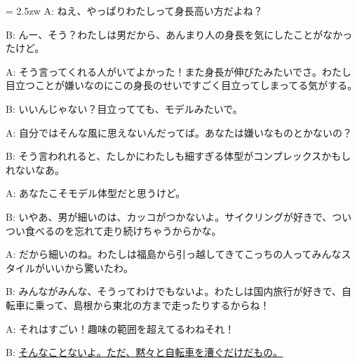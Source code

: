 \documentclass[11pt]{amsart}
\title{}
\author{}
\newenvironment{hangall}[1]{\hangindent = 2.5zw\everypar{\hangindent = 2.5zw}}{}
\begin{document}
\maketitle
\begin{hangall}{}%
A: ねえ、やっぱりわたしって身長高い方だよね？

B: んー、そう？わたしは男だから、あんまり人の身長を気にしたことがなかったけど。

A: そう言ってくれる人がいてよかった！また身長が伸びたみたいでさ。わたし目立つことが嫌いなのにこの身長のせいですごく目立ってしまってる気がする。

B: いいんじゃない？目立ってても、モデルみたいで。

A: 自分ではそんな風に思えないんだってば。あなたは嫌いなものとかないの？

B: そう言われれると、たしかにわたしも細すぎる体型がコンプレックスかもしれないなあ。

A: あなたこそモデル体型だと思うけど。

B: いやあ、男が細いのは、カッコがつかないよ。サイクリングが好きで、ついつい食べるのを忘れて走り続けちゃうからかな。

A: だから細いのね。わたしは福島から引っ越してきてこっちの人ってみんなスタイルがいいから驚いたわ。

B: みんながみんな、そうってわけでもないよ。わたしは国内旅行が好きで、自転車に乗って、島根から東北の方まで走ったりするからね！

A: それはすごい！趣味の範囲を超えてるわねそれ！

B: \ul{そんなことないよ。ただ、黙々と自転車を漕ぐだけだもの。}\end{hangall}
\end{document}
